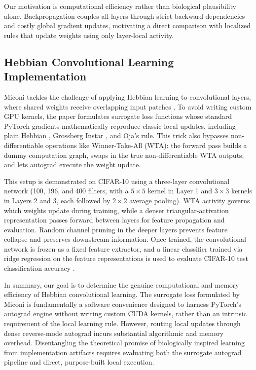 \documentclass{article}
\begin{document}
    Our motivation is computational efficiency rather than biological plausibility alone. Backpropagation couples all layers through strict backward dependencies and costly global gradient updates, motivating a direct comparison with localized rules that update weights using only layer-local activity.
    
    \subsection{Hebbian Convolutional Learning Implementation}
    
    Miconi tackles the challenge of applying Hebbian learning to convolutional layers, where shared weights receive overlapping input patches \citep{miconi2021hebbian}. To avoid writing custom GPU kernels, the paper formulates surrogate loss functions whose standard PyTorch gradients mathematically reproduce classic local updates, including plain Hebbian \cite{hebb1949organization}, Grossberg Instar \cite{grossberg1976adaptive}, and Oja's rule. This trick also bypasses non-differentiable operations like Winner-Take-All (WTA): the forward pass builds a dummy computation graph, swaps in the true non-differentiable WTA outputs, and lets autograd execute the weight update.
    
    This setup is demonstrated on CIFAR-10 using a three-layer convolutional network (100, 196, and 400 filters, with a $5\times 5$ kernel in Layer 1 and $3\times 3$ kernels in Layers 2 and 3, each followed by $2\times 2$ average pooling). WTA activity governs which weights update during training, while a denser triangular-activation representation passes forward between layers for feature propagation and evaluation. Random channel pruning in the deeper layers prevents feature collapse and preserves downstream information. Once trained, the convolutional network is frozen as a fixed feature extractor, and a linear classifier trained via ridge regression on the feature representations is used to evaluate CIFAR-10 test classification accuracy \citep{miconi2021hebbian}.
    
    In summary, our goal is to determine the genuine computational and memory efficiency of Hebbian convolutional learning. The surrogate loss formulated by Miconi is fundamentally a software convenience designed to harness PyTorch's autograd engine without writing custom CUDA kernels, rather than an intrinsic requirement of the local learning rule. However, routing local updates through dense reverse-mode autograd incurs substantial algorithmic and memory overhead. Disentangling the theoretical promise of biologically inspired learning from implementation artifacts requires evaluating both the surrogate autograd pipeline and direct, purpose-built local execution.
\end{document}
